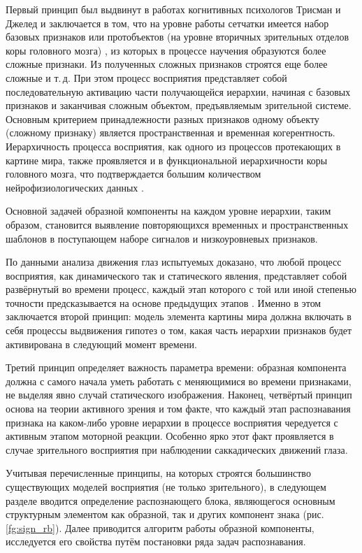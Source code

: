 Первый принцип был выдвинут в работах когнитивных психологов Трисман и Джелед \cite{Triesman1980} и заключается в том, что на уровне работы сетчатки имеется набор базовых признаков  или протобъектов (на уровне вторичных зрительных отделов коры головного мозга) \cite{Rensink2000}, из которых в процессе научения образуются более сложные признаки. Из полученных сложных признаков строятся еще более сложные и т.\,д. При этом процесс восприятия представляет собой последовательную активацию части получающейся иерархии, начиная с базовых признаков и заканчивая сложным объектом, предъявляемым зрительной системе. Основным критерием принадлежности разных признаков одному объекту (сложному признаку) является пространственная и временная когерентность. Иерархичность процесса восприятия, как одного из процессов протекающих в картине мира, также проявляется и в функциональной иерархичности коры головного мозга, что подтверждается большим количеством нейрофизиологических данных \cite{Hawkins2009, Bolotova2011}.

Основной задачей образной компоненты на каждом уровне иерархии, таким образом, становится выявление повторяющихся временных и пространственных шаблонов в поступающем наборе сигналов и низкоуровневых признаков.

По данными анализа движения глаз испытуемых доказано, что любой процесс восприятия, как динамического так и статического явления, представляет собой развёрнутый во времени процесс, каждый этап которого с той или иной степенью точности предсказывается на основе предыдущих этапов \cite{Velichkovsky2006, Hawkins2009}. Именно в этом заключается второй принцип: модель элемента картины мира должна включать в себя процессы выдвижения гипотез о том, какая часть иерархии признаков будет активирована в следующий момент времени.

Третий принцип определяет важность параметра времени: образная компонента должна с самого начала уметь работать с меняющимися во времени признаками, не выделяя явно случай статического изображения. Наконец, четвёртый принцип основа на теории активного зрения и том факте, что каждый этап распознавания признака на каком-либо уровне иерархии в процессе восприятия чередуется с активным этапом моторной реакции. Особенно ярко этот факт проявляется в случае зрительного восприятия при наблюдении саккадических движений глаза.

Учитывая перечисленные принципы, на которых строятся большинство существующих моделей восприятия (не только зрительного), в следующем разделе вводится определение распознающего блока, являющегося основным структурным элементом как образной, так и других компонент знака (рис. \ref{fg:sign_rb}). Далее приводится алгоритм работы образной компоненты, исследуется его свойства путём постановки ряда задач распознавания.

